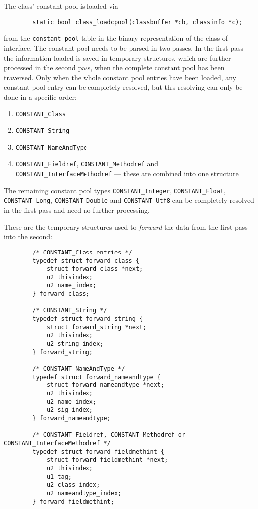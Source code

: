 The class' constant pool is loaded via

\begin{verbatim}
        static bool class_loadcpool(classbuffer *cb, classinfo *c);
\end{verbatim}

from the \texttt{constant\_pool} table in the binary representation of
the class of interface. The constant pool needs to be parsed in two
passes. In the first pass the information loaded is saved in temporary
structures, which are further processed in the second pass, when the
complete constant pool has been traversed. Only when the whole
constant pool entries have been loaded, any constant pool entry can be
completely resolved, but this resolving can only be done in a specific
order:

\begin{enumerate}
 \item \texttt{CONSTANT\_Class}

 \item \texttt{CONSTANT\_String}

 \item \texttt{CONSTANT\_NameAndType}

 \item \texttt{CONSTANT\_Fieldref}, \texttt{CONSTANT\_Methodref} and
 \texttt{CONSTANT\_InterfaceMethodref} --- these are combined into one
 structure
\end{enumerate}

\begingroup
{}
The remaining constant pool types \texttt{CONSTANT\_Integer},
\texttt{CONSTANT\_Float}, \texttt{CONSTANT\_Long},
\texttt{CONSTANT\_Double} and \texttt{CONSTANT\_Utf8} can be
completely resolved in the first pass and need no further processing.

\endgroup

These are the temporary structures used to \textit{forward} the data
from the first pass into the second:

\begin{verbatim}
        /* CONSTANT_Class entries */
        typedef struct forward_class {
            struct forward_class *next;
            u2 thisindex;
            u2 name_index;
        } forward_class;

        /* CONSTANT_String */
        typedef struct forward_string {
            struct forward_string *next;
            u2 thisindex;
            u2 string_index;
        } forward_string;

        /* CONSTANT_NameAndType */
        typedef struct forward_nameandtype {
            struct forward_nameandtype *next;
            u2 thisindex;
            u2 name_index;
            u2 sig_index;
        } forward_nameandtype;

        /* CONSTANT_Fieldref, CONSTANT_Methodref or CONSTANT_InterfaceMethodref */
        typedef struct forward_fieldmethint {
            struct forward_fieldmethint *next;
            u2 thisindex;
            u1 tag;
            u2 class_index;
            u2 nameandtype_index;
        } forward_fieldmethint;
\end{verbatim}

